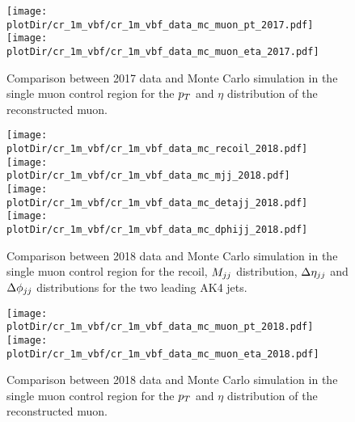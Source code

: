 \begin{figure}[htbp]
    \begin{center}
        \texttt{[image: \\plotDir/cr\_1m\_vbf/cr\_1m\_vbf\_data\_mc\_muon\_pt\_2017.pdf]}
        \texttt{[image: \\plotDir/cr\_1m\_vbf/cr\_1m\_vbf\_data\_mc\_muon\_eta\_2017.pdf]}
    \end{center}
    \caption{Comparison between 2017 data and Monte Carlo simulation in the single muon control region for 
    the $p_T$ and $\eta$ distribution of the reconstructed muon.}
    \label{fig:cr_1m_vbf_2017_mtr_2}
\end{figure}

\begin{figure}[htbp]
    \begin{center}
        \texttt{[image: \\plotDir/cr\_1m\_vbf/cr\_1m\_vbf\_data\_mc\_recoil\_2018.pdf]}
        \texttt{[image: \\plotDir/cr\_1m\_vbf/cr\_1m\_vbf\_data\_mc\_mjj\_2018.pdf]} \\
        \texttt{[image: \\plotDir/cr\_1m\_vbf/cr\_1m\_vbf\_data\_mc\_detajj\_2018.pdf]}
        \texttt{[image: \\plotDir/cr\_1m\_vbf/cr\_1m\_vbf\_data\_mc\_dphijj\_2018.pdf]}
    \end{center}
    \caption{Comparison between 2018 data and Monte Carlo simulation in the single muon control region for
        the recoil, $M_{jj}$ distribution, $\Delta \eta_{jj}$ and $\Delta \phi_{jj}$ distributions for the two leading AK4 jets.}
    \label{fig:cr_1m_vbf_2018_mtr}
\end{figure}

\begin{figure}[htbp]
    \begin{center}
        \texttt{[image: \\plotDir/cr\_1m\_vbf/cr\_1m\_vbf\_data\_mc\_muon\_pt\_2018.pdf]}
        \texttt{[image: \\plotDir/cr\_1m\_vbf/cr\_1m\_vbf\_data\_mc\_muon\_eta\_2018.pdf]}
    \end{center}
    \caption{Comparison between 2018 data and Monte Carlo simulation in the single muon control region for 
    the $p_T$ and $\eta$ distribution of the reconstructed muon.}
    \label{fig:cr_1m_vbf_2018_mtr_2}
\end{figure}

